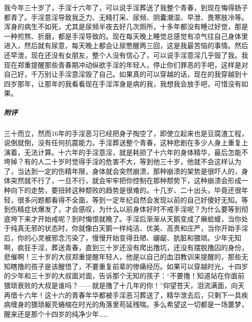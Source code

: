 \begin{case}
    我今年三十岁了，手淫十六年了，可以说手淫葬送了我整个青春，到现在悔得肠子都青了。手淫意淫导致我乏力、无精打采、尿频、阴囊潮湿、早泄、畏寒肢冷等。浑身的病生不如死，尤其是尿频半夜去好几次厕所，十多年都没有睡过好觉，那是一种煎熬、折磨，都是手淫导致的。现在每天晚上睡觉总感觉有凉气往自己身体里进入，然后就有尿意，每天晚上都会让尿憋醒两三回，这是我最苦恼的事情。然后还早泄，现在还没有女朋友，整个人没有信心了，可以说手淫意淫几乎毁了我。我现在郑重提醒那些青春期冲动纵欲手淫的年轻人，停止你们罪恶的手吧，这样是对自己好，千万别让手淫意淫毁了自己。如果真的可以穿越的话，现在的我穿越到十四岁那年，让那年的我看看现在手淫浑身是病的我，我想我会放手吧，可惜没有如果。
    \subparagraph{附评} 三十而立，然而16年的手淫恶习已经把身子掏空了，即使立起来也是豆腐渣工程，说倒就倒，没有任何抗震能力。手淫葬送整个青春，这种悲剧在多少人身上重复上演着，无法计算。十六年的手淫意淫，就是耗损了十六年的身体精华，最后怎能不垮掉？有的人二十岁时觉得手淫的危害不大，等到他三十岁，他就不会这样认为了，当达到一定的伤精年限，身体就会突然崩溃，那种崩溃的架势是很吓人的，身体突然就不行了，一旦不行，就会牢牢把你控制在那种颓势下，这种崩溃会形成一种向下的走势，要扭转这种颓败的趋势是很难的。十几岁、二十出头，毕竟还很年轻，很多问题都看得不全面，等到一定年纪自然会发现以前的自己好傻好无知。等到伤精症状爆发了，才会感叹，为什么以前身体好时不戒手淫呢？为什么要等到彻底垮下来才开始戒呢？到时悔恨就晚了。手淫后渐渐从天鹅变成了癞蛤蟆，当你处于纯真无邪的状态时，你就像白天鹅一样纯洁、优美、高贵和庄严，当你开始手淫后，你的心灵被邪念污染了，慢慢开始变得丑陋、龌龊、肮脏和猥琐。少年无知啊，疯狂手淫，葬送青春，直到三十岁还没有爬出撸坑，还没有摆脱撸囚的身份，悲催啊！三十岁的大叔郑重提醒年轻人，他是以自己的血泪教训来提醒的，那些无知瞎撸的孩子是该醒悟了，不要重复前辈的惨痛经历。如果可以穿越时光，十四岁的少年和三十岁的大叔面对面，告诉那个无知的孩子：“不要撸！知道站在你面前猥琐衰败的大叔是谁吗？——就是撸了十几年的你！”仰望苍天，泪流满面，向天再借十六年！这十六的青春年华都被手淫恶习葬送了，精华泄去后，只剩下一具疾病缠身的猥琐躯壳蜷缩在时光的角落里苟延残喘。多么希望这一切都是一场噩梦，醒来还是那个十四岁的纯净少年……
\end{case}

